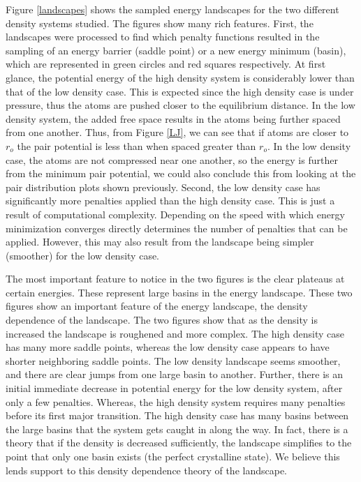 Figure \ref{landscapes} shows the sampled energy landscapes for the two different density systems studied.  The figures show many rich features.  First, the landscapes were processed to find which penalty functions resulted in the sampling of an energy barrier (saddle point) or a new energy minimum (basin), which are represented in green circles and red squares respectively.  At first glance, the potential energy of the high density system is considerably lower than that of the low density case.  This is expected since the high density case is under pressure, thus the atoms are pushed closer to the equilibrium distance.  In the low density system, the added free space results in the atoms being further spaced from one another.  Thus, from Figure \ref{LJ}, we can see that if atoms are closer to $r_o$ the pair potential is less than when spaced greater than $r_o$.  In the low density case, the atoms are not compressed near one another, so the energy is further from the minimum pair potential, we could also conclude this from looking at the pair distribution plots shown previously.  Second, the low density case has significantly more penalties applied than the high density case.  This is just a result of computational complexity.  Depending on the speed with which energy minimization converges directly determines the number of penalties that can be applied.  However, this may also result from the landscape being simpler (smoother) for the low density case.

The most important feature to notice in the two figures is the clear plateaus at certain energies.  These represent large basins in the energy landscape.  These two figures show an important feature of the energy landscape, the density dependence of the landscape.  The two figures show that as the density is increased the landscape is roughened and more complex.  The high density case has many more saddle points, whereas the low density case appears to have shorter neighboring saddle points.  The low density landscape seems smoother, and there are clear jumps from one large basin to another.  Further, there is an initial immediate decrease in potential energy for the low density system, after only a few penalties.  Whereas, the high density system requires many penalties before its first major transition.  The high density case has many basins between the large basins that the system gets caught in along the way.  In fact, there is a theory that if the density is decreased sufficiently, the landscape simplifies to the point that only one basin exists (the perfect crystalline state).  We believe this lends support to this density dependence theory of the landscape.

